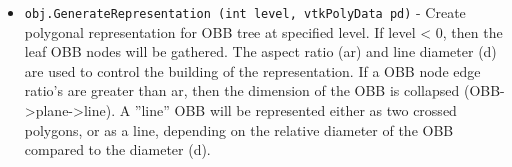 \begin{itemize}
\item  \verb|obj.GenerateRepresentation (int level, vtkPolyData pd)| -  Create polygonal representation for OBB tree at specified level. If
 level < 0, then the leaf OBB nodes will be gathered. The aspect ratio (ar)
 and line diameter (d) are used to control the building of the
 representation. If a OBB node edge ratio's are greater than ar, then the
 dimension of the OBB is collapsed (OBB->plane->line). A ''line'' OBB will be
 represented either as two crossed polygons, or as a line, depending on
 the relative diameter of the OBB compared to the diameter (d).

\end{itemize}
